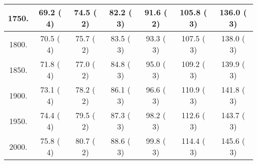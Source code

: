 \begin{tabular}{|c||c|c|c|c|c|c|}
\hline
 1750. &    69.2 (      4) &    74.5 (      2) &    82.2 (      3) &    91.6 (      2) &   105.8 (      3) &   136.0 (      3)\tabularnewline
\hline
 1800. &    70.5 (      4) &    75.7 (      2) &    83.5 (      3) &    93.3 (      3) &   107.5 (      3) &   138.0 (      3)\tabularnewline
\hline
 1850. &    71.8 (      4) &    77.0 (      2) &    84.8 (      3) &    95.0 (      3) &   109.2 (      3) &   139.9 (      3)\tabularnewline
\hline
 1900. &    73.1 (      4) &    78.2 (      2) &    86.1 (      3) &    96.6 (      3) &   110.9 (      3) &   141.8 (      3)\tabularnewline
\hline
 1950. &    74.4 (      4) &    79.5 (      2) &    87.3 (      3) &    98.2 (      3) &   112.6 (      3) &   143.7 (      3)\tabularnewline
\hline
 2000. &    75.8 (      4) &    80.7 (      2) &    88.6 (      3) &    99.8 (      3) &   114.4 (      3) &   145.6 (      3)\tabularnewline
\hline
\end{tabular}
